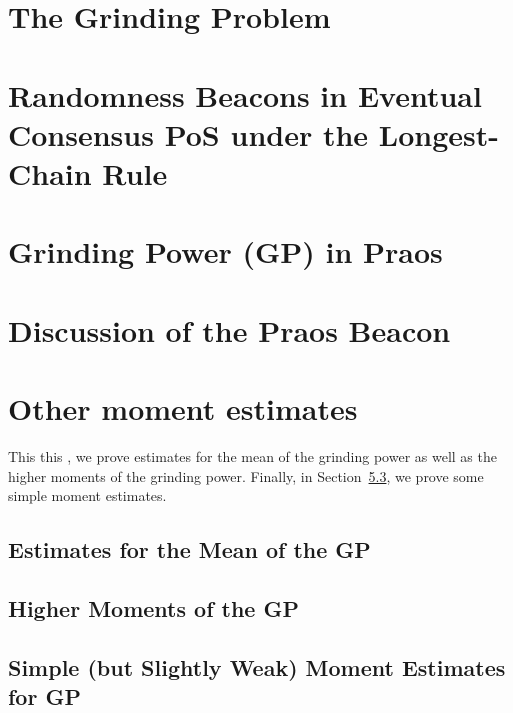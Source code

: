 


\chapter{The Grinding Problem}\label{sec:grinding-intro}


\chapter{Randomness Beacons in Eventual Consensus PoS under the Longest-Chain Rule}\label{sec:model-grinding}


% 

\chapter{Grinding Power (GP) in Praos}\label{sec:praos}


% 


\chapter{Discussion of the Praos Beacon}\label{sec:discussion-praos}



\chapter{Other moment estimates}\label{sec:praos-other-moments}
This this \Section, 
we prove estimates for the mean of the grinding power 
as well as the higher moments of the grinding power. 
Finally, in Section~\ref{sec:praos-simple-moments}, 
we prove some simple moment estimates.

\section{Estimates for the Mean of the GP}\label{sec:praos-mean}



\section{Higher Moments of the GP}\label{sec:praos-higher-moments}



\section{Simple (but Slightly Weak) Moment Estimates for GP}\label{sec:praos-simple-moments}



